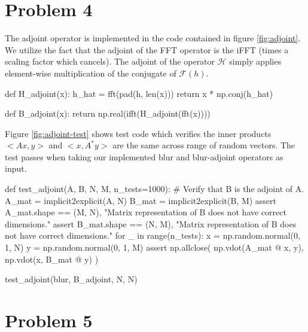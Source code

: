\documentclass{homework}
\begin{document}
\section{Problem 4}


The adjoint operator is implemented in the code contained
in figure \ref{fig:adjoint}. We utilize the fact that
the adjoint of the FFT operator is the iFFT (times a scaling factor
which cancels). The adjoint of the operator $\mathcal{H}$ simply applies
element-wise multiplication of the conjugate of $\mathcal{F}(h)$.

\begin{center}
    \begin{python}
def H_adjoint(x):
    h_hat = fft(pad(h, len(x)))
    return x * np.conj(h_hat)


def B_adjoint(x):
    return np.real(ifft(H_adjoint(fft(x))))


    \end{python}
\label{fig:adjoint}
\end{center}

Figure \ref{fig:adjoint-test} shows test code which verifies
the inner products $<Ax, y>$ and $<x, A^* y>$ are the same across
range of random vectors. The test passes when taking our implemented blur and blur-adjoint operators
as input.
    
\begin{center}
    \begin{python}

def test_adjoint(A, B, N, M, n_tests=1000):
    # Verify that B is the adjoint of A.
    A_mat = implicit2explicit(A, N)
    B_mat = implicit2explicit(B, M)
    assert A_mat.shape == (M, N), "Matrix representation of  B does not have correct dimensions."
    assert B_mat.shape == (N, M), "Matrix representation of  B does not have correct dimensions."
    for _ in range(n_tests):
        x = np.random.normal(0, 1, N)
        y = np.random.normal(0, 1, M)
        assert np.allclose(
            np.vdot(A_mat @ x, y),
            np.vdot(x, B_mat @ y)
        )

test_adjoint(blur, B_adjoint, N, N)
    \end{python}
\label{fig:adjoint-test}
\end{center}

\section{Problem 5}
\end{document}
